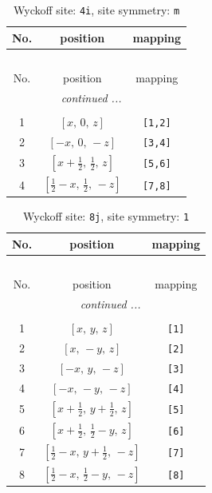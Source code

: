 \documentclass[fleqn,8pt]{jsarticle}
\begin{document}
\renewcommand{\arraystretch}{1.2}
\begin{longtable}{ccc}
\caption{Wyckoff site: {\tt 4i}, site symmetry: {\tt m}}
 \\
 \hline \hline
No. & position & mapping \\ \hline \endfirsthead

\multicolumn{2}{l}{\tablename\ \thetable{}} \\
 \hline \hline
No. & position & mapping \\ \hline \endhead

 \hline \hline
\multicolumn{2}{r}{\footnotesize\it continued ...} \\ \endfoot

 \hline \hline
\multicolumn{2}{r}{} \\ \endlastfoot

1 & $\left[ x,\, 0,\, z \right]$ & {\tt [1,2]} \\ \hline
2 & $\left[ - x,\, 0,\, - z \right]$ & {\tt [3,4]} \\ \hline
3 & $\left[ x + \frac{1}{2},\, \frac{1}{2},\, z \right]$ & {\tt [5,6]} \\ \hline
4 & $\left[ \frac{1}{2} - x,\, \frac{1}{2},\, - z \right]$ & {\tt [7,8]} \\
\end{longtable}
\renewcommand{\arraystretch}{1.2}
\begin{longtable}{ccc}
\caption{Wyckoff site: {\tt 8j}, site symmetry: {\tt 1}}
 \\
 \hline \hline
No. & position & mapping \\ \hline \endfirsthead

\multicolumn{2}{l}{\tablename\ \thetable{}} \\
 \hline \hline
No. & position & mapping \\ \hline \endhead

 \hline \hline
\multicolumn{2}{r}{\footnotesize\it continued ...} \\ \endfoot

 \hline \hline
\multicolumn{2}{r}{} \\ \endlastfoot

1 & $\left[ x,\, y,\, z \right]$ & {\tt [1]} \\ \hline
2 & $\left[ x,\, - y,\, z \right]$ & {\tt [2]} \\ \hline
3 & $\left[ - x,\, y,\, - z \right]$ & {\tt [3]} \\ \hline
4 & $\left[ - x,\, - y,\, - z \right]$ & {\tt [4]} \\ \hline
5 & $\left[ x + \frac{1}{2},\, y + \frac{1}{2},\, z \right]$ & {\tt [5]} \\ \hline
6 & $\left[ x + \frac{1}{2},\, \frac{1}{2} - y,\, z \right]$ & {\tt [6]} \\ \hline
7 & $\left[ \frac{1}{2} - x,\, y + \frac{1}{2},\, - z \right]$ & {\tt [7]} \\ \hline
8 & $\left[ \frac{1}{2} - x,\, \frac{1}{2} - y,\, - z \right]$ & {\tt [8]} \\
\end{longtable}
\end{document}
